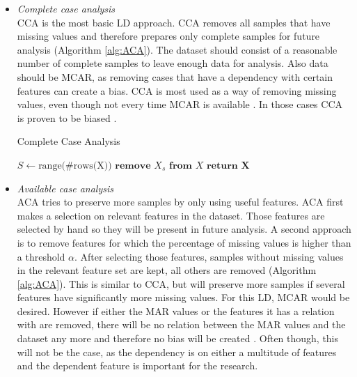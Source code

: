 \documentclass[10pt,a4paper]{report}
\begin{document}
	\begin{itemize}
		
		\item \textit{Complete case analysis} \\
		CCA is the most basic LD approach. CCA removes all samples that have missing values and therefore prepares only complete samples for future analysis (Algorithm \ref{alg:ACA}). The dataset should consist of a reasonable number of complete samples to leave enough data for analysis. Also data should be MCAR, as removing cases that have a dependency with certain features can create a bias. CCA is most used as a way of removing missing values, even though not every time MCAR is available \cite{haukoos2007advanced, patrician2002multiple, myrtveit2001analyzing, donders2006gentle}. In those cases CCA is proven to be biased \cite{cartwright2003dealing}.
		
		\begin{algorithm}[H]
			\caption{Complete Case Analysis}\label{alg:CCA}
			\begin{algorithmic}[1]
				\State $S \gets \text{range(\#rows(X))}$ 	
				 					
				 				 			
				\State $\textbf{remove } X_s \textbf{ from } X$ 				
				\EndIf
				\EndFor
				\State $\textbf{return X}$
				\EndProcedure
			\end{algorithmic}
		\end{algorithm}	
		
		\item \textit{Available case analysis} \\
		ACA tries to preserve more samples by only using useful features. ACA first makes a selection on relevant features in the dataset. Those features are selected by hand so they will be present in future analysis. A second approach is to remove features for which the percentage of missing values is higher than a threshold $\alpha$. After selecting those features, samples without missing values in the relevant feature set are kept, all others are removed (Algorithm \ref{alg:ACA}). This is similar to CCA, but will preserve more samples if several features have significantly more missing values. For this LD, MCAR would be desired. However if either the MAR values or the features it has a relation with are removed, there will be no relation between the MAR values and the dataset any more and therefore no bias will be created \cite{haukoos2007advanced, donders2006gentle, patrician2002multiple, myrtveit2001analyzing}. Often though, this will not be the case, as the dependency is on either a multitude of features and the dependent feature is important for the research.
		

\end{itemize}
\end{document}
